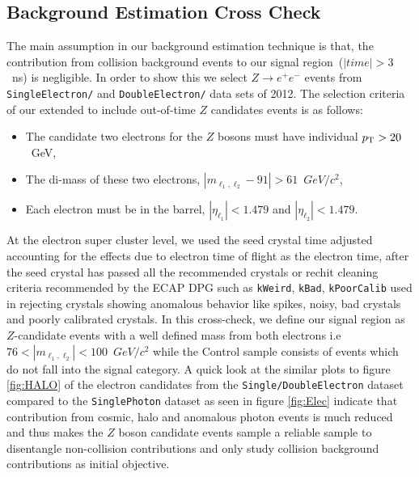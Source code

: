 \subsection{Background Estimation Cross Check}
The main assumption in our background estimation technique is that, the contribution from collision background events to our signal region~($|time| > 3$~ns) is negligible.
In order to show this we select $Z\rightarrow e^{+} e^{-}$ events from \texttt{SingleElectron/} and \texttt{DoubleElectron/} data sets of 2012.
The selection criteria of our extended to include out-of-time $Z$ candidates events is as follows:
\begin{itemize}
\item The candidate two electrons for the $Z$ bosons must have individual $p_{\mathrm{T}} > 20$~GeV,
\item The di-mass of these two electrons, $|m_{\ell_{1}, \ell_{2}} - 91| > 61$~$GeV/c^{2}$,
\item Each electron must be in the barrel, $|\eta_{\ell_{1}}| < 1.479$ and $ |\eta_{\ell_{2}}| < 1.479$.
\end{itemize}
 At the electron super cluster level,  we used the seed crystal time adjusted accounting for the effects due to electron time of flight as the electron time, after the seed crystal has passed all the recommended crystals or rechit cleaning criteria recommended by the ECAP DPG such as \texttt{kWeird}, \texttt{kBad}, \texttt{kPoorCalib} used in rejecting crystals showing anomalous behavior like spikes, noisy, bad crystals and poorly calibrated crystals.
In this cross-check, we define our signal region as $Z$-candidate events with a well defined mass from both electrons i.e  $76 < |m_{\ell_{1}, \ell_{2}}| < 100$~$GeV/c^{2}$ while the Control sample consists of events which do not fall into the signal category.
A quick look at the similar plots to figure \ref{fig:HALO} of the electron candidates from the \texttt{Single/DoubleElectron} dataset compared to the \texttt{SinglePhoton} dataset as seen in figure \ref{fig:Elec} indicate that contribution from cosmic, halo and anomalous photon events is much reduced and thus makes the $Z$ boson candidate events sample a reliable sample to disentangle non-collision contributions and only study collision background contributions as initial objective.
